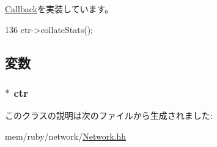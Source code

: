 \hyperlink{classCallback_a142b75b68a6291400e20fb0dd905b1c8}{Callback}を実装しています。


\begin{DoxyCode}
136 {ctr->collateStats();}
\end{DoxyCode}


\subsection{変数}
\hypertarget{classNetwork_1_1StatsCallback_a78229efdbb514c8c35d14a0457feca02}{
\subsubsection[{ctr}]{$\ast$ {\bf ctr}}}
\label{classNetwork_1_1StatsCallback_a78229efdbb514c8c35d14a0457feca02}


このクラスの説明は次のファイルから生成されました:\begin{DoxyCompactItemize}
\item 
mem/ruby/network/\hyperlink{Network_8hh}{Network.hh}\end{DoxyCompactItemize}
